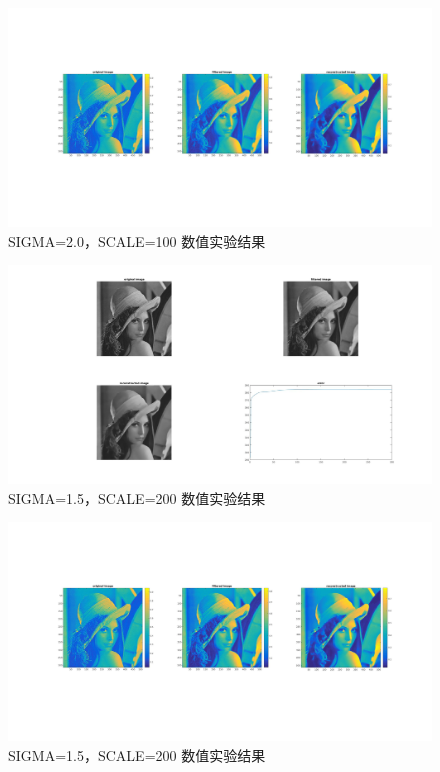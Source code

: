 \documentclass[a4paper, UTF8]{ctexrep}
\begin{document}
				\begin{figure}[htbp!]
					\includegraphics[width = 1 \textwidth]{fig5.jpg}
					\caption{SIGMA=2.0，SCALE=100 数值实验结果}
				\end{figure}
				\begin{figure}[htbp!]
					\includegraphics[width = 1 \textwidth]{fig6.jpg}
					\caption{SIGMA=1.5，SCALE=200 数值实验结果}
				\end{figure}
				\begin{figure}[htbp!]
					\includegraphics[width = 1 \textwidth]{fig7.jpg}
					\caption{SIGMA=1.5，SCALE=200 数值实验结果}
				\end{figure}
\end{document}
